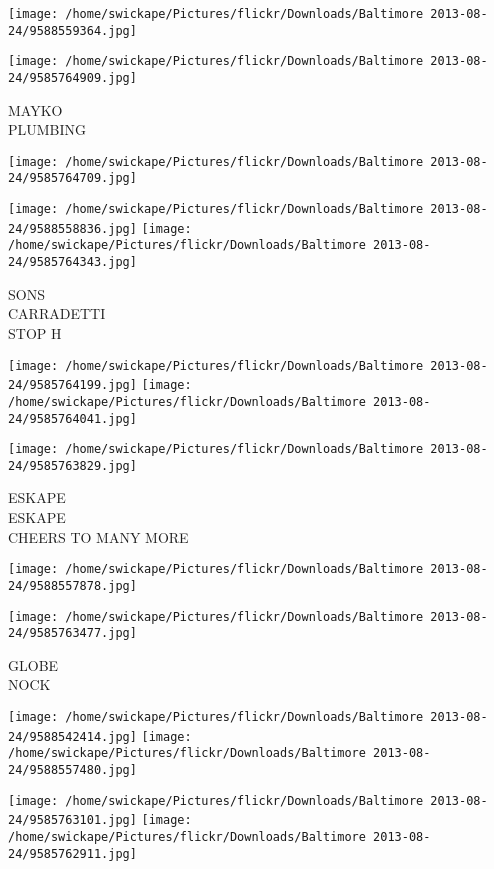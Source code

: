 \documentclass[10pt,letterpaper]{article}
\begin{document}
\texttt{[image: /home/swickape/Pictures/flickr/Downloads/Baltimore 2013-08-24/9588559364.jpg]}

\vspace{0.25in}
\texttt{[image: /home/swickape/Pictures/flickr/Downloads/Baltimore 2013-08-24/9585764909.jpg]}

MAYKO\\
PLUMBING
\pagebreak

\texttt{[image: /home/swickape/Pictures/flickr/Downloads/Baltimore 2013-08-24/9585764709.jpg]}

\vspace{0.25in}
\texttt{[image: /home/swickape/Pictures/flickr/Downloads/Baltimore 2013-08-24/9588558836.jpg]}
\texttt{[image: /home/swickape/Pictures/flickr/Downloads/Baltimore 2013-08-24/9585764343.jpg]}

SONS\\
CARRADETTI\\
STOP H
\pagebreak

\texttt{[image: /home/swickape/Pictures/flickr/Downloads/Baltimore 2013-08-24/9585764199.jpg]}
\texttt{[image: /home/swickape/Pictures/flickr/Downloads/Baltimore 2013-08-24/9585764041.jpg]}

\vspace{0.25in}
\texttt{[image: /home/swickape/Pictures/flickr/Downloads/Baltimore 2013-08-24/9585763829.jpg]}

ESKAPE\\
ESKAPE\\
CHEERS TO MANY MORE
\pagebreak

\texttt{[image: /home/swickape/Pictures/flickr/Downloads/Baltimore 2013-08-24/9588557878.jpg]}

\vspace{0.25in}
\texttt{[image: /home/swickape/Pictures/flickr/Downloads/Baltimore 2013-08-24/9585763477.jpg]}

GLOBE\\
NOCK
\pagebreak

\texttt{[image: /home/swickape/Pictures/flickr/Downloads/Baltimore 2013-08-24/9588542414.jpg]}
\texttt{[image: /home/swickape/Pictures/flickr/Downloads/Baltimore 2013-08-24/9588557480.jpg]}

\texttt{[image: /home/swickape/Pictures/flickr/Downloads/Baltimore 2013-08-24/9585763101.jpg]}
\texttt{[image: /home/swickape/Pictures/flickr/Downloads/Baltimore 2013-08-24/9585762911.jpg]}
\end{document}
